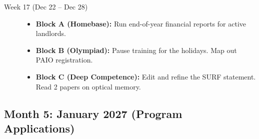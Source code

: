 \documentclass[11pt,a4paper]{article}
\begin{document}
\begin{description}
    \item[Week 17 (Dec 22 -- Dec 28)] \hfill
    \begin{itemize}
        \item \textbf{Block A (Homebase):} Run end-of-year financial reports for active landlords.
        \item \textbf{Block B (Olympiad):} Pause training for the holidays. Map out PAIO registration.
        \item \textbf{Block C (Deep Competence):} Edit and refine the SURF statement. Read 2 papers on optical memory.
    \end{itemize}
\end{description}

\subsection{Month 5: January 2027 (Program Applications)}
\end{document}
